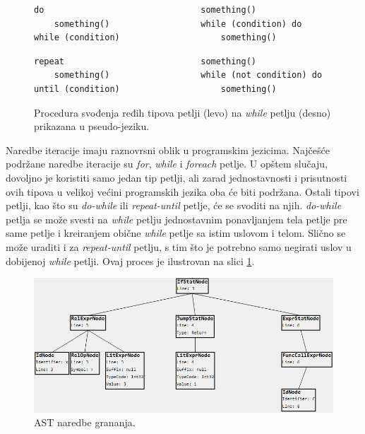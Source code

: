 \begin{figure}[h!]
\begin{lstlisting}
do                               something()
    something()                  while (condition) do
while (condition)                    something()
\end{lstlisting}
\begin{lstlisting}
repeat                           something()
    something()                  while (not condition) do
until (condition)                    something()
\end{lstlisting}
\caption{Procedura svođenja ređih tipova petlji (levo) na \emph{while} petlju (desno) prikazana u pseudo-jeziku.}
\label{fig:ASTIterationStatements}
\end{figure}

Naredbe iteracije imaju raznovrsni oblik u programskim jezicima. Najčešće podržane naredbe iteracije su \emph{for}, \emph{while} i \emph{foreach} petlje. U opštem slučaju, dovoljno je koristiti samo jedan tip petlji, ali zarad jednostavnosti i prisutnosti ovih tipova u velikoj većini programskih jezika oba će biti podržana. Ostali tipovi petlji, kao što su \emph{do-while} ili \emph{repeat-until} petlje, će se svoditi na njih. \emph{do-while} petlja se može svesti na \emph{while} petlju jednostavnim ponavljanjem tela petlje pre same petlje i kreiranjem obične \emph{while} petlje sa istim uslovom i telom. Slično se može uraditi i za \emph{repeat-until} petlju, s tim što je potrebno samo negirati uslov u dobijenoj \emph{while} petlji. Ovaj proces je ilustrovan na slici \ref{fig:ASTIterationStatements}.

\begin{figure}[h!]
\centering
\includegraphics[scale=0.7]{images/ast_stat.png}
\caption{AST naredbe grananja.}
\label{fig:MyASTExampleStatement}
\end{figure}
